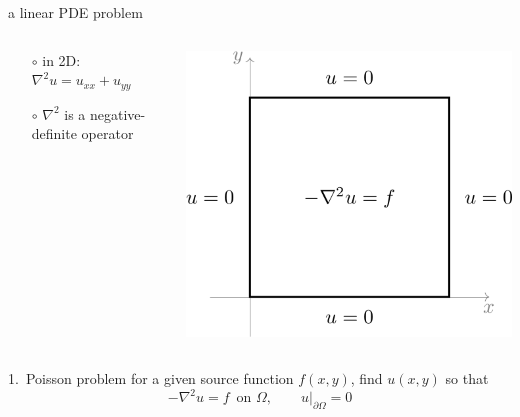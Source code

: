 \documentclass[10pt,
               svgnames,
               hyperref={colorlinks,citecolor=DeepPink4,linkcolor=FireBrick,urlcolor=Maroon},
               usepdftitle=false]{beamer}
\newcommand{\grad}{\nabla}
\begin{document}
\begin{frame}{a linear PDE problem}
\begin{columns}
\begin{column}{0.6\textwidth}
\begin{itemize}
    \begin{itemize}
    \item[$\circ$] in 2D: \quad $\grad^2 u = u_{xx} + u_{yy}$
    \item[$\circ$] $\grad^2$ is a negative-definite operator
    \end{itemize}
\end{itemize}
\end{column}
\begin{column}{0.4\textwidth}
\hfill \includegraphics[width=\textwidth]{images/poisson.png}
\end{column}
\end{columns}

\bigskip
\begin{block}{1.~Poisson problem} for a given source function $f(x,y)$, find $u(x,y)$ so that
    $$-\grad^2 u = f \, \text{ on } \Omega, \qquad u\big|_{\partial \Omega} = 0$$
\end{block}
\end{frame}
\end{document}
